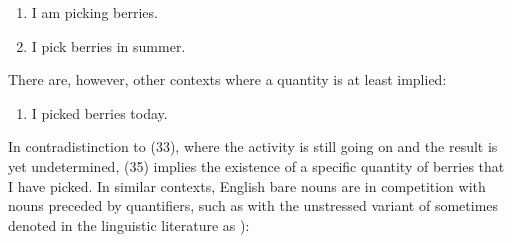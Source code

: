 \begin{enumerate} %
\item 
\label{bkm:Ref78699401}I am picking berries.

\item 
\label{bkm:Ref95014405}I pick berries in summer.

\end{enumerate} %
There are, however, other contexts where a quantity is at least implied:

\begin{enumerate} %
\item 
\label{bkm:Ref78699451}I picked berries today. 

\end{enumerate} %
In contradistinction to (33), where the activity is still going on and the result is yet undetermined, (35) implies the existence of a specific quantity of berries that I have picked. In similar contexts, English bare nouns are in competition with nouns preceded by quantifiers, such as with the unstressed variant of  sometimes denoted in the linguistic literature as ):

